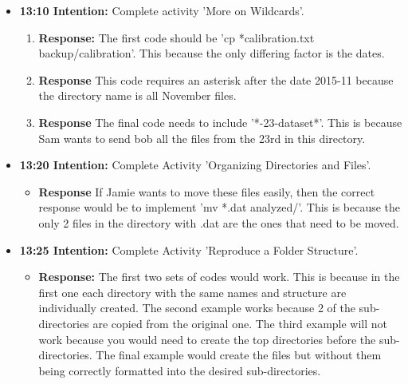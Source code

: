 \documentclass{article}
\begin{document}
\begin{itemize}
\item{\textbf{ 13:10 Intention:} Complete activity 'More on Wildcards'.}
\begin{enumerate}
\item{\textbf{Response:} The first code should be 'cp *calibration.txt backup/calibration'. This because the only differing factor is the dates.}
\item{\textbf{Response} This code requires an asterisk after the date 2015-11 because the directory name is all November files.}
\item{\textbf{Response} The final code needs to include '*-23-dataset*'. This is because Sam wants to send bob all the files from the 23rd in this directory.}
\end{enumerate}

\item{\textbf{13:20 Intention:} Complete Activity 'Organizing Directories and Files'.}

\begin{itemize}
\item{\textbf{Response} If Jamie wants to move these files easily, then the correct response would be to implement 'mv *.dat analyzed/'. This is because the only 2 files in the directory with .dat are the ones that need to be moved.} 
\end{itemize}

\item{\textbf{13:25 Intention:} Complete Activity 'Reproduce a Folder Structure'.}

\begin{itemize}
\item{\textbf{Response:} The first two sets of codes would work. This is because in the first one each directory with the same names and structure are individually created. The second example works because 2 of the sub-directories are copied from the original one. The third example will not work because you would need to create the top directories before the sub-directories. The final example would create the files but without them being correctly formatted into the desired sub-directories.} 
\end{itemize}



\end{itemize}
\end{document}
